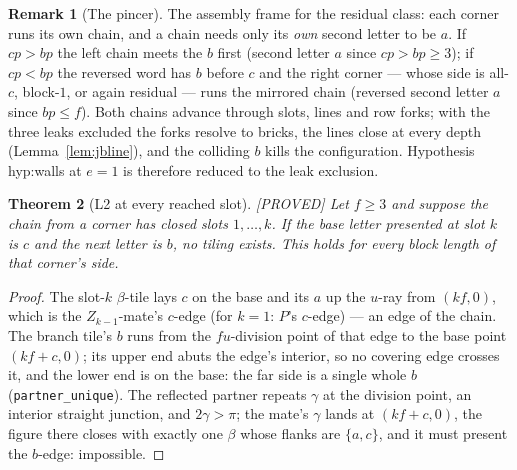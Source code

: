 \documentclass[11pt,reqno]{amsart}
\theoremstyle{plain}
\newtheorem{theorem}{Theorem}
\theoremstyle{definition}
\newtheorem{remark}[theorem]{Remark}
\newcommand{\lab}[1]{\hfill\textnormal{\footnotesize\textsc{[#1]}}}
\begin{document}
\begin{remark}[The pincer]\label{rem:pincer}
The assembly frame for the residual class: each corner runs its own chain, and a chain needs
only its \emph{own} second letter to be $a$. If $cp>bp$ the left chain meets the $b$ first
(second letter $a$ since $cp>bp\ge3$); if $cp<bp$ the reversed word has $b$ before $c$ and the
right corner — whose side is all-$c$, block-$1$, or again residual — runs the mirrored chain
(reversed second letter $a$ since $bp\le f$). Both chains advance through slots, lines and row
forks; with the three leaks excluded the forks resolve to bricks, the lines close at every
depth (Lemma~\ref{lem:jbline}), and the colliding $b$ kills the configuration. Hypothesis
hyp:walls at $e=1$ is therefore reduced to the leak exclusion.
\end{remark}


\begin{theorem}[L2 at every reached slot]\label{thm:l2slot}\lab{PROVED}
Let $f\ge3$ and suppose the chain from a corner has closed slots $1,\dots,k$. If the base letter
presented at slot $k$ is $c$ and the next letter is $b$, no tiling exists. This holds for every
block length of that corner's side.
\end{theorem}
\begin{proof}
The slot-$k$ $\beta$-tile lays $c$ on the base and its $a$ up the $u$-ray from $(kf,0)$, which is
the $Z_{k-1}$-mate's $c$-edge (for $k=1$: $P$'s $c$-edge) --- an edge of the chain. The branch
tile's $b$ runs from the $fu$-division point of that edge to the base point $(kf+c,0)$; its upper
end abuts the edge's interior, so no covering edge crosses it, and the lower end is on the base:
the far side is a single whole $b$ (\texttt{partner\_unique}). The reflected partner repeats
$\gamma$ at the division point, an interior straight junction, and $2\gamma>\pi$; the mate's
$\gamma$ lands at $(kf+c,0)$, the figure there closes with exactly one $\beta$ whose flanks are
$\{a,c\}$, and it must present the $b$-edge: impossible.
\end{proof}
\end{document}
